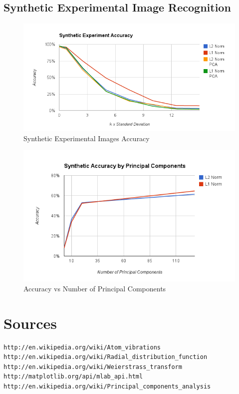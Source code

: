 \documentclass[12pt,letterpaper]{article}
\begin{document}
\clearpage

\subsection{Synthetic Experimental Image Recognition}
\begin{figure}[ht]
  \begin{center}
    \includegraphics[scale=0.8]{figs/accuracy_with_pca.png}
    \caption{Synthetic Experimental Images Accuracy}
  \end{center}
\end{figure}

\begin{figure}[ht]
  \begin{center}
    \includegraphics[scale=0.8]{figs/accuracy_by_num_pc.png}
    \caption{Accuracy vs Number of Principal Components}
  \end{center}
\end{figure}
\clearpage


\section{Sources}
\begin{verbatim}
http://en.wikipedia.org/wiki/Atom_vibrations
http://en.wikipedia.org/wiki/Radial_distribution_function
http://en.wikipedia.org/wiki/Weierstrass_transform
http://matplotlib.org/api/mlab_api.html
http://en.wikipedia.org/wiki/Principal_components_analysis
\end{verbatim}
\end{document}
